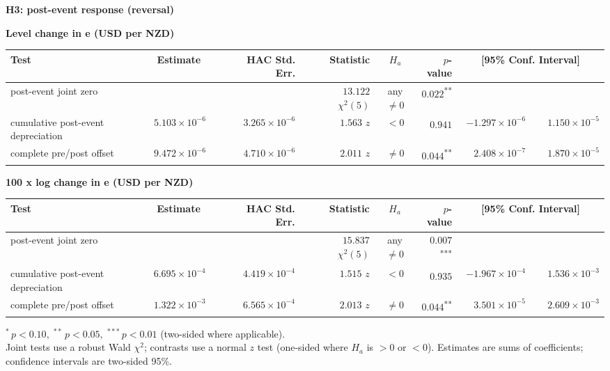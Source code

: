 \documentclass[10pt]{article}
\begin{document}
\begin{center}\large\textbf{H3: post-event response (reversal)}\end{center}
\noindent\textbf{Level change in e (USD per NZD)}\\[0.3em]
\begin{tabular}{@{}>{\raggedright\arraybackslash}p{2.9in}|r@{}l rrcr rr@{}}
\hline
Test & \multicolumn{2}{c}{Estimate} & HAC Std. Err. & Statistic & $H_a$ & $p$-value & \multicolumn{2}{c}{[95\% Conf. Interval]} \\
\hline
post-event joint zero &  &  &  & $\phantom{-}13.122$ $\chi^2(5)$ & any $\neq 0$ & $0.022$\textsuperscript{**} &  &  \\
cumulative post-event depreciation & $\phantom{-}5.103\!\times\!10^{-6}$ &  & $\phantom{-}3.265\!\times\!10^{-6}$ & $\phantom{-}1.563$ $z$ & $<0$ & $0.941$\textsuperscript{} & $-1.297\!\times\!10^{-6}$ & $\phantom{-}1.150\!\times\!10^{-5}$ \\
complete pre/post offset & $\phantom{-}9.472\!\times\!10^{-6}$ &  & $\phantom{-}4.710\!\times\!10^{-6}$ & $\phantom{-}2.011$ $z$ & $\neq 0$ & $0.044$\textsuperscript{**} & $\phantom{-}2.408\!\times\!10^{-7}$ & $\phantom{-}1.870\!\times\!10^{-5}$ \\
\hline
\end{tabular}
\vspace{1em}

\noindent\textbf{100 x log change in e (USD per NZD)}\\[0.3em]
\begin{tabular}{@{}>{\raggedright\arraybackslash}p{2.9in}|r@{}l rrcr rr@{}}
\hline
Test & \multicolumn{2}{c}{Estimate} & HAC Std. Err. & Statistic & $H_a$ & $p$-value & \multicolumn{2}{c}{[95\% Conf. Interval]} \\
\hline
post-event joint zero &  &  &  & $\phantom{-}15.837$ $\chi^2(5)$ & any $\neq 0$ & $0.007$\textsuperscript{***} &  &  \\
cumulative post-event depreciation & $\phantom{-}6.695\!\times\!10^{-4}$ &  & $\phantom{-}4.419\!\times\!10^{-4}$ & $\phantom{-}1.515$ $z$ & $<0$ & $0.935$\textsuperscript{} & $-1.967\!\times\!10^{-4}$ & $\phantom{-}1.536\!\times\!10^{-3}$ \\
complete pre/post offset & $\phantom{-}1.322\!\times\!10^{-3}$ &  & $\phantom{-}6.565\!\times\!10^{-4}$ & $\phantom{-}2.013$ $z$ & $\neq 0$ & $0.044$\textsuperscript{**} & $\phantom{-}3.501\!\times\!10^{-5}$ & $\phantom{-}2.609\!\times\!10^{-3}$ \\
\hline
\end{tabular}
\vspace{1em}

{\footnotesize $^{*}\,p<0.10,\;^{**}\,p<0.05,\;^{***}\,p<0.01$ (two-sided where applicable).}
{\footnotesize\\ Joint tests use a robust Wald $\chi^2$; contrasts use a normal $z$ test (one-sided where $H_a$ is $>0$ or $<0$). Estimates are sums of coefficients; confidence intervals are two-sided 95\%.}
\end{document}
